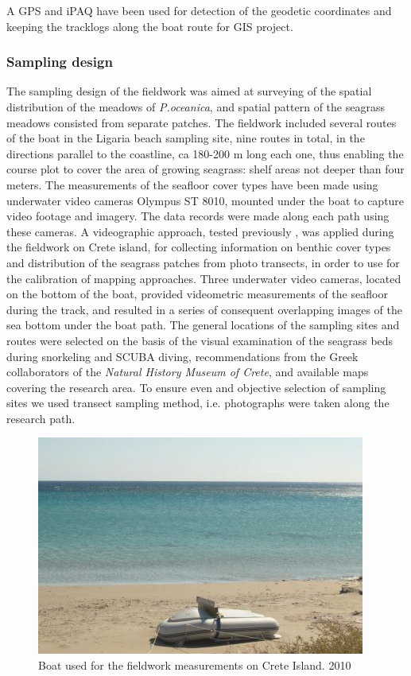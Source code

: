 \documentclass[11pt]{article}
\begin{document}
A \ac{GPS} and \ac{iPAQ} have been used for detection of the geodetic coordinates and keeping the tracklogs
along the boat route for \ac{GIS} project.

\subsubsection{Sampling design}
The sampling design of the fieldwork was aimed at surveying of the spatial distribution of the
meadows of \textit{P.oceanica}, and spatial pattern of the seagrass meadows consisted from separate
patches. The fieldwork included several routes of the boat in the Ligaria beach sampling site, nine
routes in total, in the directions parallel to the coastline, ca 180-200 m long each one, thus enabling the
course plot to cover the area of growing seagrass: shelf areas not deeper than four meters.
The measurements of the seafloor cover types have been made using underwater video cameras
Olympus ST 8010, mounted under the boat to capture video footage and imagery. The data records
were made along each path using these cameras. A videographic approach, tested previously \cite{Norris97}\label{Norris97},
 was applied during the fieldwork on Crete island, for collecting information on benthic cover types and
distribution of the seagrass patches from photo transects, in order to use for the calibration of mapping approaches.
Three underwater video cameras, located on the bottom of the boat, provided videometric measurements of the
seafloor during the track, and resulted in a series of consequent overlapping images of the sea bottom under the
boat path. The general locations of the sampling sites and routes were selected on the basis of the visual examination
of the seagrass beds during snorkeling and \ac{SCUBA} diving, recommendations from the Greek collaborators of the \textit{Natural History Museum of Crete}, and available maps covering the research area. To ensure even and objective selection of sampling sites
we used transect sampling method, i.e. photographs were taken along the research path. 

\begin{figure}[H]
	\centering
	\includegraphics[scale=0.70]{Fig-18.jpg}
	\caption{Boat used for the fieldwork measurements on Crete Island. 2010}
	\label{fig:3.4}
\end{figure}
\end{document}
